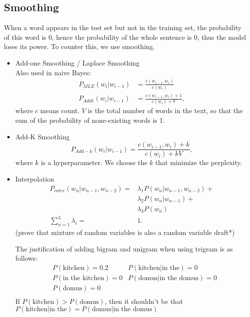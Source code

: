 \documentclass{report}
\begin{document}
\subsection{Smoothing}
When a word appears in the test set but not in the training set, the probability of this word is 0, hence the probability of the whole sentence is 0, thus the model loses its power. To counter this, we use smoothing.
\begin{itemize}
	\item Add-one Smoothing / Laplace Smoothing\\
		Also used in naive Bayes:
	\begin{align*}
		P_{MLE}(w_i | w_{i-1}) &= \frac{c(w_{i-1}, w_i)}{c(w_i)}\\
		P_{Add1}(w_i | w_{i-1}) &= \frac{c(w_{i-1}, w_i) + 1}{c(w_i) + V},
	\end{align*}
	where $c$ means count. $V$ is the total number of words in the text, so that the sum of the probability of none-existing words is 1.
	\item Add-K Smoothing
		\[
		P_{Add-k}(w_i | w_{i-1}) = \frac{c(w_{i-1}, w_i) + k}{c(w_i) + kV}
		,\] 
		where $k$ is a hyperparameter. We choose the $k$ that minimize the perplexity.
	\item Interpolation \\
		\begin{align*}
			P_{inter}(w_n | w_{n-1}, w_{n-2}) =& \lambda_1 P(w_n | w_{n-1}, w_{n-2}) +\\
			& \lambda_2 P(w_n | w_{n-1}) +\\
			& \lambda_3 P(w_n)\\
			\sum_{n=1}^{3} \lambda_i =& 1
		.\end{align*}
		(prove that mixture of random variables is also a random variable draft*)

		The justification of adding bigram and unigram when using trigram is as follows:
\begin{align*}
&P(\text{kitchen}) = 0.2 
		   &P(\text{kitchen} | \text{in the}) = 0\\
		   &P(\text{in the kitchen}) = 0
			  &P(\text{domus} | \text{in the domus}) = 0\\
			  &P(\text{domus}) = 0\\
\end{align*}
If $P(\text{kitchen}) > P(\text{domus})$, then it shouldn't be that $P(\text{kitchen} | \text{in the}) = P(\text{domus} | \text{in the domus})$
		
\end{itemize}
\end{document}

